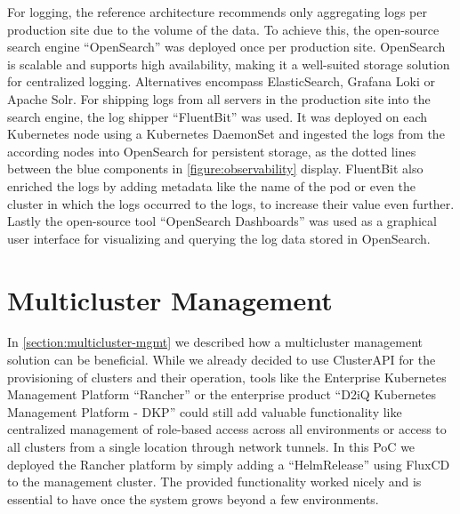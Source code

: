         For logging, the reference architecture recommends only aggregating logs per production site due to the volume of the data. To achieve this, the open-source search engine ``OpenSearch'' was deployed once per production site. OpenSearch is scalable and supports high availability, making it a well-suited storage solution for centralized logging. Alternatives encompass ElasticSearch, Grafana Loki or Apache Solr. For shipping logs from all servers in the production site into the search engine, the log shipper ``FluentBit'' was used. It was deployed on each Kubernetes node using a Kubernetes DaemonSet and ingested the logs from the according nodes into OpenSearch for persistent storage, as the dotted lines between the blue components in \autoref{figure:observability} display. FluentBit also enriched the logs by adding metadata like the name of the pod or even the cluster in which the logs occurred to the logs, to increase their value even further. Lastly the open-source tool ``OpenSearch Dashboards'' was used as a graphical user interface for visualizing and querying the log data stored in OpenSearch. 
    

    \section{Multicluster Management}

        In \autoref{section:multicluster-mgmt} we described how a multicluster management solution can be beneficial. While we already decided to use ClusterAPI for the provisioning of clusters and their operation, tools like the Enterprise Kubernetes Management Platform ``Rancher'' or the enterprise product ``D2iQ Kubernetes Management Platform - DKP'' could still add valuable functionality like centralized management of role-based access across all environments or access to all clusters from a single location through network tunnels. In this PoC we deployed the Rancher platform by simply adding a ``HelmRelease'' using FluxCD to the management cluster. The provided functionality worked nicely and is essential to have once the system grows beyond a few environments.

